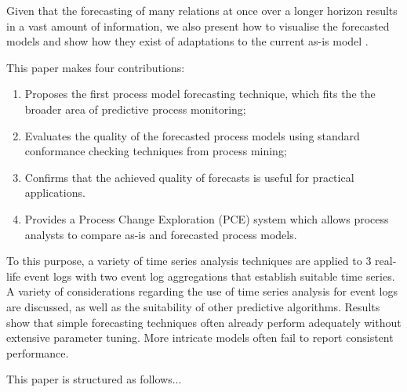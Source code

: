 Given that the forecasting of many relations at once over a longer horizon results in a vast amount of information, we also present how to visualise the forecasted models and show how they exist of adaptations to the current as-is model \cite{DBLP:conf/er/KabicherKR11}.

This paper makes four contributions:
\begin{enumerate}
	\item Proposes the first process model forecasting technique, which fits the the broader area of predictive process monitoring;
	\item Evaluates the quality of the forecasted process models using standard conformance checking techniques from process mining;
	\item Confirms that the achieved quality of forecasts is useful for practical applications.
	\item Provides a Process Change Exploration (PCE) system which allows process analysts to compare as-is and forecasted process models.
\end{enumerate}
To this purpose, a variety of time series analysis techniques are applied to 3 real-life event logs with two event log aggregations that establish suitable time series. 
A variety of considerations regarding the use of time series analysis for event logs are discussed, as well as the suitability of other predictive algorithms.
Results show that simple forecasting techniques often already perform adequately without extensive parameter tuning. More intricate models often fail to report consistent performance.

This paper is structured as follows...